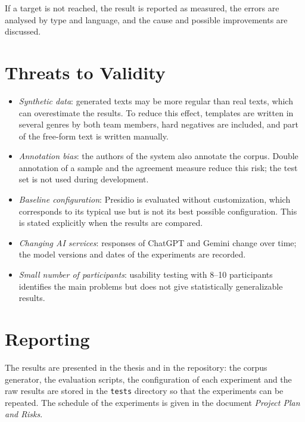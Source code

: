 \documentclass[12pt,a4paper]{article}
\begin{document}
If a target is not reached, the result is reported as measured, the errors are analysed by type and language, and the cause and possible improvements are discussed.

\section{Threats to Validity}

\begin{itemize}
\item \emph{Synthetic data}: generated texts may be more regular than real texts, which can overestimate the results. To reduce this effect, templates are written in several genres by both team members, hard negatives are included, and part of the free-form text is written manually.
\item \emph{Annotation bias}: the authors of the system also annotate the corpus. Double annotation of a sample and the agreement measure reduce this risk; the test set is not used during development.
\item \emph{Baseline configuration}: Presidio is evaluated without customization, which corresponds to its typical use but is not its best possible configuration. This is stated explicitly when the results are compared.
\item \emph{Changing AI services}: responses of ChatGPT and Gemini change over time; the model versions and dates of the experiments are recorded.
\item \emph{Small number of participants}: usability testing with 8--10 participants identifies the main problems but does not give statistically generalizable results.
\end{itemize}

\section{Reporting}

The results are presented in the thesis and in the repository: the corpus generator, the evaluation scripts, the configuration of each experiment and the raw results are stored in the \texttt{tests} directory so that the experiments can be repeated. The schedule of the experiments is given in the document \emph{Project Plan and Risks}.
\end{document}
